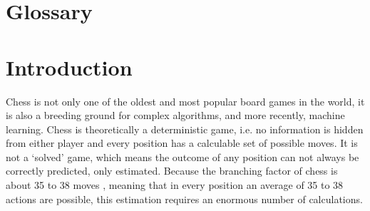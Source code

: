 \documentclass{article}
\begin{document}


\newpage
\section*{Glossary}


\newpage
\setcounter{section}{0}
\section{Introduction}


Chess is not only one of the oldest and most popular board games in the world, it is also a breeding ground for
complex algorithms, and more recently, machine learning. Chess is theoretically a deterministic game, i.e.
no information is hidden from either player and every position has a calculable set of possible moves.
It is not a `solved' game, which means the outcome of any position can not always be correctly predicted, only estimated. 
Because the branching factor of chess is about 35 to 38 moves \cite{BranchingFactorChessprogramming}, 
meaning that in every position an average of 35 to 38 actions are possible, 
this estimation requires an enormous number of calculations.
\end{document}
